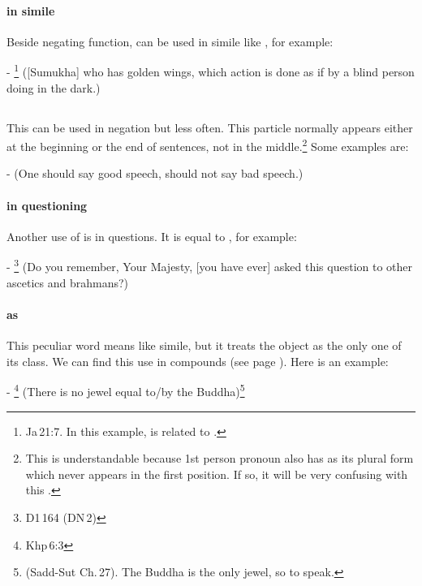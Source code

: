 \paragraph*{ in simile} Beside negating function,  can be used in simile like , for example:\par
- \footnote{Ja\,21:7. In this example,  is related to .} ([Sumu\-kha] who has golden wings, which action is done as if by a blind person doing in the dark.) \par

\subsection*{}\label{nip:no}
This can be used in negation but less often. This particle normally appears either at the beginning or the end of sentences, not in the middle.\footnote{This is understandable because 1st person pronoun also has  as its plural form which never appears in the first position. If so, it will be very confusing with this .} Some examples are:\par
-  (One should say good speech, should not say bad speech.) \par
\paragraph*{ in questioning} Another use of  is in questions. It is equal to , for example:\par
- \footnote{D1\,164 (DN\,2)} (Do you remember, Your Majesty, [you have ever] asked this question to other ascetics and brahmans?) \par
\paragraph*{ as } This peculiar word means like simile, but it treats the object as the only one of its class. We can find this use in compounds (see page \pageref{par:samasa-avadh}). Here is an example:\par
- \footnote{Khp\,6:3} (There is no jewel equal to/by the Buddha)\footnote{ (Sadd-Sut Ch.\,27). The Buddha is the only jewel, so to speak.} \par

